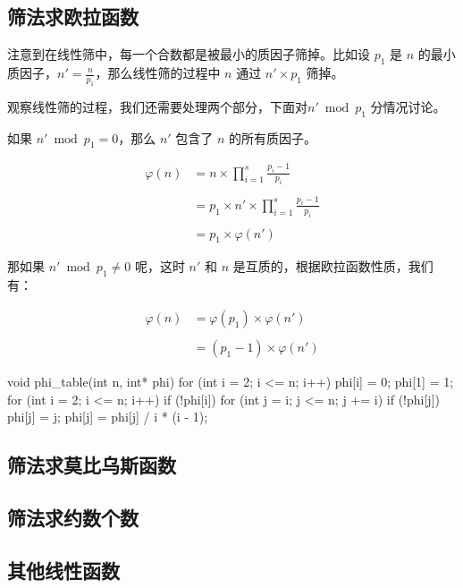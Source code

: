 \subsection{筛法求欧拉函数}

注意到在线性筛中，每一个合数都是被最小的质因子筛掉。比如设 $p_1$ 是 $n$ 的最小质因子，$n' = \frac{n}{p_1}$，那么线性筛的过程中 $n$ 通过 $n' \times p_1$ 筛掉。

观察线性筛的过程，我们还需要处理两个部分，下面对$n' \bmod p_1$ 分情况讨论。

如果 $n' \bmod p_1 = 0$，那么 $n'$ 包含了 $n$ 的所有质因子。

$$
\begin{aligned}
\varphi(n) & = n \times \prod_{i = 1}^s{\frac{p_i - 1}{p_i}} \\\\
& = p_1 \times n' \times \prod_{i = 1}^s{\frac{p_i - 1}{p_i}} \\\\
& = p_1 \times \varphi(n')
\end{aligned}
$$

那如果 $n' \bmod p_1 \neq 0$ 呢，这时 $n'$ 和 $n$ 是互质的，根据欧拉函数性质，我们有：

$$
\begin{aligned}
\varphi(n) & = \varphi(p_1) \times \varphi(n') \\\\
& = (p_1 - 1) \times \varphi(n')
\end{aligned}
$$

\begin{cppcode}
void phi_table(int n, int* phi) {
  for (int i = 2; i <= n; i++) phi[i] = 0;
  phi[1] = 1;
  for (int i = 2; i <= n; i++)
    if (!phi[i])
      for (int j = i; j <= n; j += i) {
        if (!phi[j]) phi[j] = j;
        phi[j] = phi[j] / i * (i - 1);
      }
}
\end{cppcode}

\subsection{筛法求莫比乌斯函数}

\subsection{筛法求约数个数}

\subsection{其他线性函数}
